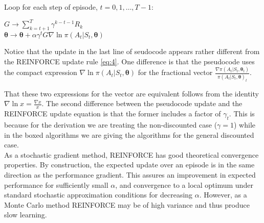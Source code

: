 {\begin{tcolorbox}[colback=black!7!white,colframe=black!75!white,title=\textbf{REINFORCE: Monte-Carlo Policy-Gradient Control (episodic) for $\pi_*$}]
    \qquad Loop for each step of episode, $t=0,1,\dots, T-1$:

    \qquad\qquad $G\rightarrow\sum_{k=t+1}^T\gamma^{k-t-1}R_k$\\
    \qquad\qquad$\bm{\theta}\rightarrow \bm{\theta}+\alpha\gamma^tG\nabla\ln\pi(A_t|S_t, \bm{\theta})$
\end{tcolorbox}
Notice that the update in the last line of seudocode appears rather different from the REINFORCE update rule \ref{eq:4}. One difference is that the pseudocode uses the compact expression $\nabla\ln\pi(A_t|S_t, \bm{\theta})$ for the fractional vector $\frac{\nabla\pi(A_t|S_t, \bm{\theta}_t)}{\pi(A_t|S_t, \bm{\theta})_t}$. 

That these two expressions for the vector are equivalent follows from the identity $\nabla\ln x=\frac{\nabla x}{x}$.
The second difference between the pseudocode update and the REINFORCE update equation is that the former includes a factor of $\gamma_t$. This is because for the derivation we are treating the non-discounted case ($\gamma=1$) while in the boxed
algorithms we are giving the algorithms for the general discounted case.\\

As a stochastic gradient method, REINFORCE has good theoretical convergence properties. By construction, the expected update over an episode is in the same direction as the performance gradient. This assures an improvement in expected performance for sufficiently small $\alpha$, and convergence to a local optimum under standard stochastic approximation conditions for decreasing $\alpha$. However, as a Monte Carlo method REINFORCE may be of high variance and thus produce slow learning.

}
